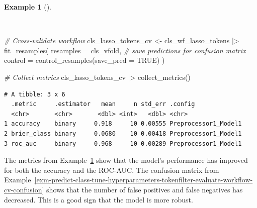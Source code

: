 \documentclass[
  letterpaper,
  krantz1]{latex/krantz-mod}
\newenvironment{Shaded}{\begin{snugshade}}{\end{snugshade}}
\newcommand{\AttributeTok}[1]{\textcolor[rgb]{0.00,0.00,0.00}{#1}}
\newcommand{\CommentTok}[1]{\textcolor[rgb]{0.00,0.00,0.00}{\textit{#1}}}
\newcommand{\ConstantTok}[1]{\textcolor[rgb]{0.00,0.00,0.00}{#1}}
\newcommand{\FunctionTok}[1]{\textcolor[rgb]{0.00,0.00,0.00}{#1}}
\newcommand{\NormalTok}[1]{\textcolor[rgb]{0.00,0.00,0.00}{#1}}
\newcommand{\OtherTok}[1]{\textcolor[rgb]{0.00,0.00,0.00}{#1}}
\newcommand{\SpecialCharTok}[1]{\textcolor[rgb]{0.00,0.00,0.00}{#1}}
\theoremstyle{definition}
\newtheorem{example}{Example}[chapter]
\theoremstyle{definition}
\theoremstyle{remark}
\begin{document}
\begin{example}[]\protect\hypertarget{exm-predict-class-tune-hyperparameters-tokenfilter-evaluate-workflow-cv-collect}{}\label{exm-predict-class-tune-hyperparameters-tokenfilter-evaluate-workflow-cv-collect}

~

\begin{Shaded}
\begin{Highlighting}[numbers=left,,]
\CommentTok{\# Cross{-}validate workflow}
\NormalTok{cls\_lasso\_tokens\_cv }\OtherTok{\textless{}{-}}
\NormalTok{  cls\_wf\_lasso\_tokens }\SpecialCharTok{|\textgreater{}}
  \FunctionTok{fit\_resamples}\NormalTok{(}
    \AttributeTok{resamples =}\NormalTok{ cls\_vfold,}
    \CommentTok{\# save predictions for confusion matrix}
    \AttributeTok{control =} \FunctionTok{control\_resamples}\NormalTok{(}\AttributeTok{save\_pred =} \ConstantTok{TRUE}\NormalTok{)}
\NormalTok{  )}

\CommentTok{\# Collect metrics}
\NormalTok{cls\_lasso\_tokens\_cv }\SpecialCharTok{|\textgreater{}}
  \FunctionTok{collect\_metrics}\NormalTok{()}
\end{Highlighting}
\end{Shaded}

\begin{verbatim}
# A tibble: 3 x 6
  .metric     .estimator   mean     n std_err .config             
  <chr>       <chr>       <dbl> <int>   <dbl> <chr>               
1 accuracy    binary     0.918     10 0.00555 Preprocessor1_Model1
2 brier_class binary     0.0680    10 0.00418 Preprocessor1_Model1
3 roc_auc     binary     0.968     10 0.00289 Preprocessor1_Model1
\end{verbatim}

\end{example}

The metrics from
Example~\ref{exm-predict-class-tune-hyperparameters-tokenfilter-evaluate-workflow-cv-collect}
show that the model's performance has improved for both the accuracy and
the ROC-AUC. The confusion matrix from
Example~\ref{exm-predict-class-tune-hyperparameters-tokenfilter-evaluate-workflow-cv-confusion}
shows that the number of false positives and false negatives has
decreased. This is a good sign that the model is more robust.
\end{document}
